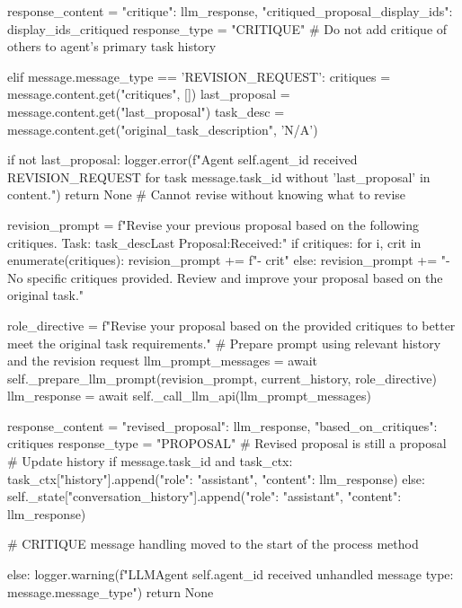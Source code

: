 \documentclass{amsbook}
\theoremstyle{definition}
\theoremstyle{remark}
\numberwithin{equation}{chapter} %
\begin{document}
\begin{python}
                 response_content = {"critique": llm_response, "critiqued_proposal_display_ids": display_ids_critiqued}
                 response_type = "CRITIQUE"
                 # Do not add critique of others to agent's primary task history


            elif message.message_type == 'REVISION_REQUEST':
                 critiques = message.content.get("critiques", [])
                 last_proposal = message.content.get("last_proposal")
                 task_desc = message.content.get("original_task_description", 'N/A')

                 if not last_proposal:
                      logger.error(f"Agent {self.agent_id} received REVISION_REQUEST for task {message.task_id} without 'last_proposal' in content.")
                      return None # Cannot revise without knowing what to revise

                 revision_prompt = f"Revise your previous proposal based on the following critiques. \nOriginal Task: {task_desc}\nYour Last Proposal:\n\nCritiques Received:\n"
                 if critiques:
                     for i, crit in enumerate(critiques):
                         revision_prompt += f"- {crit}\n"
                 else:
                      revision_prompt += "- No specific critiques provided. Review and improve your proposal based on the original task.\n"

                 role_directive = f"Revise your proposal based on the provided critiques to better meet the original task requirements."
                 # Prepare prompt using relevant history and the revision request
                 llm_prompt_messages = await self._prepare_llm_prompt(revision_prompt, current_history, role_directive)
                 llm_response = await self._call_llm_api(llm_prompt_messages)

                 response_content = {"revised_proposal": llm_response, "based_on_critiques": critiques}
                 response_type = "PROPOSAL" # Revised proposal is still a proposal
                 # Update history
                 if message.task_id and task_ctx: task_ctx["history"].append({"role": "assistant", "content": llm_response})
                 else: self._state["conversation_history"].append({"role": "assistant", "content": llm_response})

            # CRITIQUE message handling moved to the start of the process method

            else:
                logger.warning(f"LLMAgent {self.agent_id} received unhandled message type: {message.message_type}")
                return None


\end{python}
\end{document}
